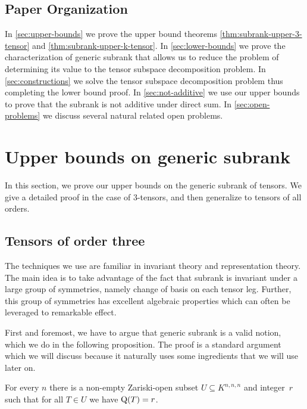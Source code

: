 \documentclass[11pt]{article}
\theoremstyle{definition}
\theoremstyle{remark}
\newcommand{\subrank}{{\rm Q}}
\begin{document}
\subsection{Paper Organization}

In \autoref{sec:upper-bounds} we prove the upper bound theorems \autoref{thm:subrank-upper-3-tensor} and \autoref{thm:subrank-upper-k-tensor}. In \autoref{sec:lower-bounds} we prove the characterization of generic subrank that allows us to reduce the problem of determining its value to the tensor subspace decomposition problem. In \autoref{sec:constructions} we solve the tensor subspace decomposition problem thus completing the lower bound proof. 
In \autoref{sec:not-additive} we use our upper bounds to prove that the subrank is not additive under direct sum.
In \autoref{sec:open-problems} we discuss several natural related open problems.

\newpage

\section{Upper bounds on generic subrank}\label{sec:upper-bounds}
In this section, we prove our upper bounds on the generic subrank of tensors. We give a detailed proof in the case of $3$-tensors, and then generalize to tensors of all orders.

\subsection{Tensors of order three}

The techniques we use are familiar in invariant theory and representation theory. The main idea is to take advantage of the fact that subrank is invariant under a large group of symmetries, namely change of basis on each tensor leg. Further, this group of symmetries has excellent algebraic properties which can often be leveraged to remarkable effect. 


First and foremost, we have to argue that generic subrank is a valid notion, which we do in the following proposition. The proof is a standard argument which we will discuss because it naturally uses some ingredients that we will use later on.
\begin{proposition}\label{prop:gen-subrank-exists}
For every $n$ there is a non-empty Zariski-open subset $U \subseteq K^{n,n,n}$ and integer~$r$ such that for all $T \in U$ we have $\subrank(T) = r$.
\end{proposition}
\end{document}

